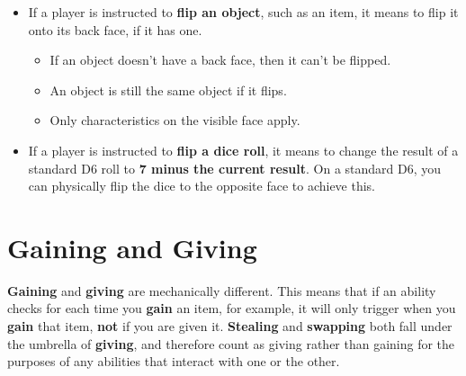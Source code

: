 \documentclass[a4paper, twoside]{report} %
\begin{document}
    \begin{itemize}
        \item If a player is instructed to \textbf{flip an object}, such as an item, it means to flip it onto its back face, if it has one.
        \begin{itemize}
            \item If an object doesn’t have a back face, then it can’t be flipped.
            \item An object is still the same object if it flips.
            \item Only characteristics on the visible face apply.
        \end{itemize}
        \item If a player is instructed to \textbf{flip a dice roll}, it means to change the result of a standard D6 roll to \textbf{7 minus the current result}. On a standard D6, you can physically flip the dice to the opposite face to achieve this.
    \end{itemize}
    \section{Gaining and Giving}
    \label{gaining}
    \textbf{Gaining} and \textbf{giving} are mechanically different. This means that if an ability checks for each time you \textbf{gain} an item, for example, it will only trigger when you \textbf{gain} that item, \textbf{not} if you are given it. \textbf{Stealing} and \textbf{swapping} both fall under the umbrella of \textbf{giving}, and therefore count as giving rather than gaining for the purposes of any abilities that interact with one or the other.
\end{document}
